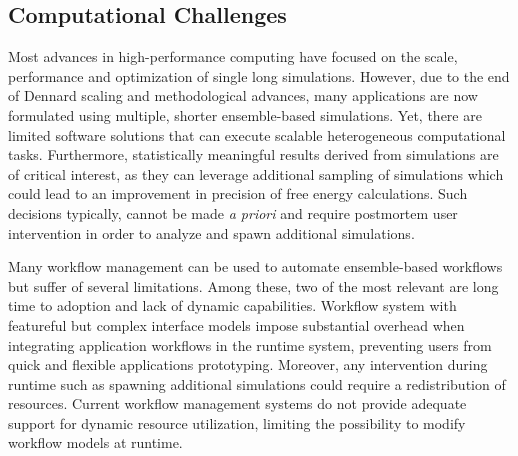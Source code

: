\subsection{Computational Challenges}

Most advances in high-performance computing have focused on the scale,
performance and optimization of single long simulations. However, due to the
end of Dennard scaling and methodological advances, many applications are now
formulated using multiple, shorter ensemble-based simulations. Yet, there are
limited software solutions that can execute scalable heterogeneous
computational tasks. Furthermore, statistically meaningful results derived
from simulations are of critical interest, as they can leverage additional
sampling of simulations which could lead to an improvement in precision 
of free energy calculations. Such decisions typically, cannot be made {\it a
priori} and require postmortem user intervention in order to analyze and spawn
additional simulations.




Many workflow management can be used to automate ensemble-based workflows but
suffer of several limitations. Among these, two of the most relevant are long
time to adoption and lack of dynamic capabilities.
Workflow system with featureful but complex interface models impose
substantial overhead when integrating application workflows in the runtime
system, preventing users from quick and flexible applications prototyping.
Moreover, any intervention during runtime such as spawning additional 
simulations could require a redistribution of resources.  
Current workflow management systems do not provide adequate
support for dynamic resource utilization, limiting the possibility to modify 
workflow models at runtime. 

